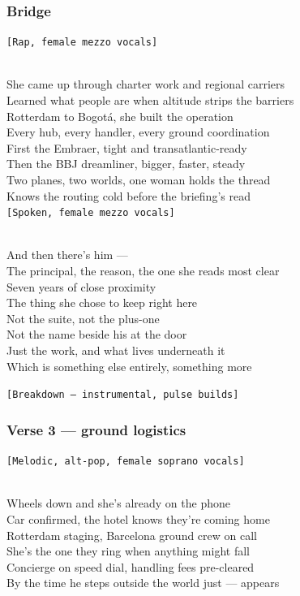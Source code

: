 \subsubsection{Bridge}\label{bridge-25}

\texttt{{[}Rap,\ female\ mezzo\ vocals{]}}\strut \\
She came up through charter work and regional carriers\\
Learned what people are when altitude strips the barriers\\
Rotterdam to Bogotá, she built the operation\\
Every hub, every handler, every ground coordination\\
First the Embraer, tight and transatlantic-ready\\
Then the BBJ dreamliner, bigger, faster, steady\\
Two planes, two worlds, one woman holds the thread\\
Knows the routing cold before the briefing's read\\
\texttt{{[}Spoken,\ female\ mezzo\ vocals{]}}\strut \\
And then there's him ---\\
The principal, the reason, the one she reads most clear\\
Seven years of close proximity\\
The thing she chose to keep right here\\
Not the suite, not the plus-one\\
Not the name beside his at the door\\
Just the work, and what lives underneath it\\
Which is something else entirely, something more

\texttt{{[}Breakdown\ —\ instrumental,\ pulse\ builds{]}}

\subsubsection{Verse 3 --- ground
logistics}\label{verse-3-ground-logistics}

\texttt{{[}Melodic,\ alt-pop,\ female\ soprano\ vocals{]}}\strut \\
Wheels down and she's already on the phone\\
Car confirmed, the hotel knows they're coming home\\
Rotterdam staging, Barcelona ground crew on call\\
She's the one they ring when anything might fall\\
Concierge on speed dial, handling fees pre-cleared\\
By the time he steps outside the world just --- appears

